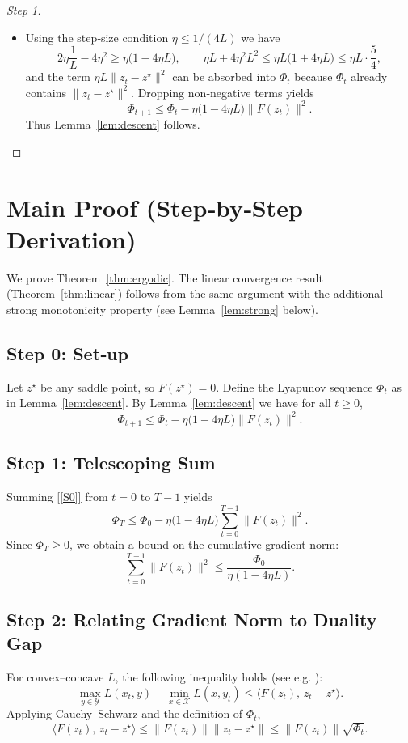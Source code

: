 \documentclass[11pt]{article}
\begin{document}
\begin{proof}[Step 1]
\begin{itemize}
\[
\Phi_{t+1}\le \Phi_t-2\eta\Big(\frac{1}{L}\|F(z_t)\|^2\Big)
+4\eta^2\|F(z_t)\|^2
+ \Big( \eta L +4\eta^2L^2\Big)\|z_t-z_{t-1}\|^2
+ \eta L\|z_t-z^{\star}\|^2.
\tag{[Step 10]}
\]
\item[Step 11] Using the step‑size condition $\eta\le 1/(4L)$ we have
\[
2\eta\frac{1}{L}-4\eta^2\ge \eta\Big(1-4\eta L\Big),
\qquad
\eta L+4\eta^2L^2\le \eta L\bigl(1+4\eta L\bigr)\le\eta L\cdot\frac{5}{4},
\]
and the term $\eta L\|z_t-z^{\star}\|^2$ can be absorbed into $\Phi_t$ because $\Phi_t$ already contains $\|z_t-z^{\star}\|^2$. Dropping non‑negative terms yields
\[
\Phi_{t+1}\le \Phi_t-\eta\bigl(1-4\eta L\bigr)\|F(z_t)\|^2.
\tag{[Step 11]}
\]
Thus Lemma~\ref{lem:descent} follows. \hfill\qedsymbol
\end{itemize}
\end{proof}

\section*{Main Proof (Step‑by‑Step Derivation)}
We prove Theorem~\ref{thm:ergodic}. The linear convergence result (Theorem~\ref{thm:linear}) follows from the same argument with the additional strong monotonicity property (see Lemma~\ref{lem:strong} below).

\subsection*{Step 0: Set‑up}
Let $z^{\star}$ be any saddle point, so $F(z^{\star})=0$. Define the Lyapunov sequence $\Phi_t$ as in Lemma~\ref{lem:descent}. By Lemma~\ref{lem:descent} we have for all $t\ge0$,
\[
\Phi_{t+1}\le\Phi_t-\eta\bigl(1-4\eta L\bigr)\|F(z_t)\|^2.
\tag{[S0]}
\]

\subsection*{Step 1: Telescoping Sum}
Summing \eqref{[S0]} from $t=0$ to $T-1$ yields
\[
\Phi_T\le\Phi_0-\eta\bigl(1-4\eta L\bigr)\sum_{t=0}^{T-1}\|F(z_t)\|^2.
\tag{[S1]}
\]
Since $\Phi_T\ge0$, we obtain a bound on the cumulative gradient norm:
\[
\sum_{t=0}^{T-1}\|F(z_t)\|^2\le\frac{\Phi_0}{\eta(1-4\eta L)}.
\tag{[S2]}
\]

\subsection*{Step 2: Relating Gradient Norm to Duality Gap}
For convex–concave $L$, the following inequality holds (see e.g. \cite{nemirovski2004prox}):
\[
\max_{y\in\mathcal Y}L(x_t,y)-\min_{x\in\mathcal X}L(x,y_t)
\le \langle F(z_t),\,z_t-z^{\star}\rangle.
\tag{[S3]}
\]
Applying Cauchy–Schwarz and the definition of $\Phi_t$,
\[
\langle F(z_t),\,z_t-z^{\star}\rangle
\le \|F(z_t)\|\|z_t-z^{\star}\|
\le \|F(z_t)\|\sqrt{\Phi_t}.
\tag{[S4]}
\]
\end{document}
